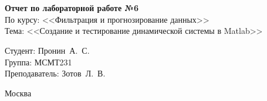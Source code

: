 \begin{titlepage}
	\centering
	
	\vspace{-2.2mm}
	\vhrulefill{0.9mm}\\
	\vspace{-7mm}
	\vhrulefill{0.2mm}\\
	\vspace{2mm}
	
	\vspace{50mm}
	
	\vspace{30mm}
	
	\textbf{Отчет по лабораторной работе №6}\\
	По курсу: <<Фильтрация и прогнозирование данных>>\\
	Тема: <<Создание и тестирование динамической системы в  Matlab>>\\
	
	\vspace{60mm}
	
	\hspace{70mm} Студент:       \hfill Пронин~А.~С.\\
	\hspace{70mm} Группа:        \hfill МСМТ231\\
	\hspace{70mm} Преподаватель: \hfill Зотов~Л.~В.\\
	
	\vfill
	
	Москва\\
	\the\year
\end{titlepage}

\setcounter{page}{2}